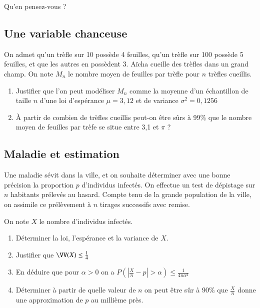 \documentclass[oneside,12pt]{article}          %
\begin{document}
Qu'en pensez-vous ? 



\subsection{Une variable chanceuse}
On admet qu'un trèfle sur 10 possède 4 feuilles, qu'un trèfle sur 100 possède 5 feuilles, et que les autres en possèdent 3. Aïcha cueille des trèfles dans un grand champ. On note $M_n$ le nombre moyen de feuilles par trèfle pour $n$ trèfles cueillis.
\begin{enumerate}
    \item Justifier que l'on peut modéliser $M_n$ comme la moyenne d'un échantillon de taille $n$ d'une loi d'espérance $\mu=3,12$ et de variance $\sigma^2=0,1256$
    \item À partir de combien de trèfles cueillis peut-on être sûrs à 99\% que le nombre moyen de feuilles par trèfe se situe entre 3,1 et $\pi$ ?
\end{enumerate}



\subsection{Maladie et estimation}
Une maladie sévit dans la ville, et on souhaite déterminer avec une bonne précision la proportion $p$ d'individus infectés. On effectue un test de dépistage sur $n$ habitants prélevés au hasard. Compte tenu de la grande population de la ville, on assimile ce prélèvement à $n$ tirages successifs avec remise.

On note $X$ le nombre d'individus infectés.
\begin{enumerate}
    \item Déterminer la loi, l'espérance et la variance de $X$.
    \item Justifier que $\VV(X)\leq\frac{1}{4}$
    \item En déduire que pour $\alpha>0$ on a $P\left(|\frac{X}{n}-p|>\alpha\right)\leq\frac{1}{4n\alpha^2}$
    \item Déterminer à partir de quelle valeur de $n$ on peut être sûr à 90\% que $\frac{X}{n}$ donne une approximation de $p$ au millième près.
\end{enumerate}
\end{document}
